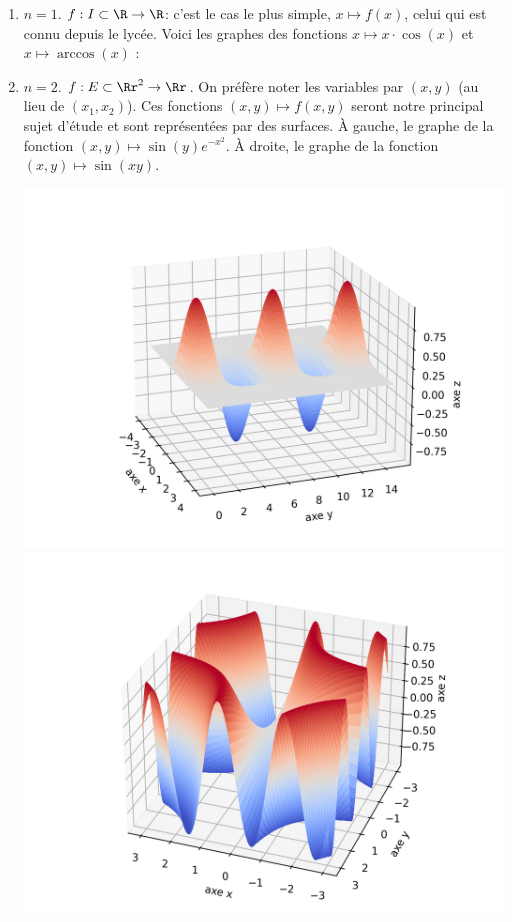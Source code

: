 \documentclass[11pt, class=report,crop=false]{standalone}
\begin{document}
\begin{exemple}
\sauteligne
\begin{enumerate}
\item $n=1$. $f: I \subset \R \rightarrow \R$:  c'est le cas le plus simple,
$x \mapsto f(x)$, celui qui est connu depuis le lycée. Voici les graphes des fonctions $x \mapsto x \cdot \cos(x)$ et $x \mapsto \arccos(x)$ :


\item $n=2$. $f: E \subset \Rr^2 \rightarrow \Rr$. 
On préfère noter les variables par $(x,y)$ (au lieu de $(x_1,x_2)$).
Ces fonctions $(x,y) \mapsto f(x,y)$ seront notre principal sujet d'étude et sont représentées par des surfaces. 
À gauche, le graphe de la fonction $ (x,y) \mapsto \sin(y)e^{-x^2}$.
À droite, le graphe de la fonction $ (x,y) \mapsto \sin(xy)$.
\begin{center}
    \includegraphics[scale=\myscale,scale=0.5]{figures/fonctions-intro-01}
    \includegraphics[scale=\myscale,scale=0.5]{figures/fonctions-intro-02}
\end{center}

\end{enumerate}
\end{exemple}
\end{document}
